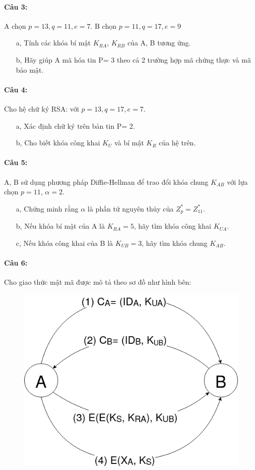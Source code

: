 \documentclass[paper=a4, fontsize=11pt]{scrartcl}
\numberwithin{equation}{section}		%
\numberwithin{figure}{section}			%
\numberwithin{table}{section}				%
\begin{document}
	\paragraph{Câu 3:} A chọn $p= 13, q= 11, e= 7$. B chọn $p= 11, q= 17, e= 9$
	
	\begin{itemize}
		\item[a,] Tính các khóa bí mật $K_{RA}$, $K_{RB}$ của A, B tương ứng.
		\item[b,] Hãy giúp A mã hóa tin P= 3 theo cả 2 trường hợp mã chứng thực và mã bảo mật.
	\end{itemize}
	
	\paragraph{Câu 4:} Cho hệ chữ ký RSA: với $p= 13, q= 17, e= 7$.
	
	\begin{itemize}
		\item[a,] Xác định chữ ký trên bản tin P= 2.
		\item[b,] Cho biết khóa công khai $K_U$ và bí mật $K_R$ của hệ trên.
	\end{itemize}
	
	\paragraph{Câu 5:} A, B sử dụng phương pháp Diffie-Hellman để trao đổi khóa chung $K_{AB}$ với lựa chọn $p= 11$, $\alpha= 2$.
	
	\begin{itemize}
		\item[a,] Chứng minh rằng $\alpha$ là phần tử nguyên thủy của $Z_p^*= Z_{11}^*$.
		\item[b,] Nếu khóa bí mật của A là $K_{RA}= 5$, hãy tìm khóa công khai $K_{UA}$.
		\item[c,] Nếu khóa công khai của B là $K_{UB}= 3$, hãy tìm khóa chung $K_{AB}$.
	\end{itemize}
	
	\paragraph{Câu 6:} Cho giao thức mật mã được mô tả theo sơ đồ như hình bên:
	\begin{figure}[H]
		\centering
		\label{fig:sodobmtt}
		\includegraphics[width=0.5\linewidth]{SoDoBMTT}
	\end{figure}
	
\end{document}
